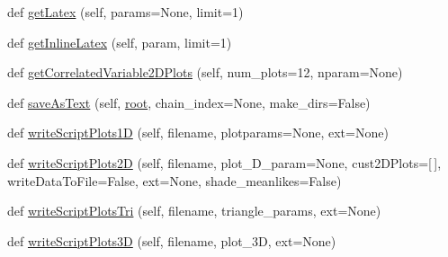 \begin{DoxyCompactItemize}
\item 
def \mbox{\hyperlink{classgetdist_1_1mcsamples_1_1MCSamples_aa4fc7b33808a24cb90238f2b24500899}{get\+Latex}} (self, params=None, limit=1)
\item 
def \mbox{\hyperlink{classgetdist_1_1mcsamples_1_1MCSamples_ad03ae7e378ba02de8fcecb16934b9e65}{get\+Inline\+Latex}} (self, param, limit=1)
\item 
def \mbox{\hyperlink{classgetdist_1_1mcsamples_1_1MCSamples_ab30ef86c7ea5a38b6f4104a5c9055bd8}{get\+Correlated\+Variable2\+D\+Plots}} (self, num\+\_\+plots=12, nparam=None)
\item 
def \mbox{\hyperlink{classgetdist_1_1mcsamples_1_1MCSamples_af250b2532a15a5c4000b56f54598c3ce}{save\+As\+Text}} (self, \mbox{\hyperlink{classgetdist_1_1chains_1_1Chains_ae8dd7bf3c841a906ae7d6b3c83326c75}{root}}, chain\+\_\+index=None, make\+\_\+dirs=False)
\item 
def \mbox{\hyperlink{classgetdist_1_1mcsamples_1_1MCSamples_a658aa2c258861d420985ec8065481efa}{write\+Script\+Plots1D}} (self, filename, plotparams=None, ext=None)
\item 
def \mbox{\hyperlink{classgetdist_1_1mcsamples_1_1MCSamples_a23206744ace06726c8026481294f3f63}{write\+Script\+Plots2D}} (self, filename, plot\+\_\+D\+\_\+param=None, cust2\+D\+Plots=\mbox{[}$\,$\mbox{]}, write\+Data\+To\+File=False, ext=None, shade\+\_\+meanlikes=False)
\item 
def \mbox{\hyperlink{classgetdist_1_1mcsamples_1_1MCSamples_a13bcb199afa7e06273aee1b088532078}{write\+Script\+Plots\+Tri}} (self, filename, triangle\+\_\+params, ext=None)
\item 
def \mbox{\hyperlink{classgetdist_1_1mcsamples_1_1MCSamples_a244915a2af3b365f1d5f65bde7926e9c}{write\+Script\+Plots3D}} (self, filename, plot\+\_\+3D, ext=None)
\end{DoxyCompactItemize}
